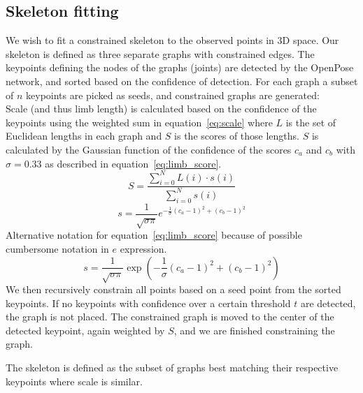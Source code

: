 \subsection{Skeleton fitting}

We wish to fit a constrained skeleton to the observed points in 3D space. Our skeleton is defined as three separate graphs with constrained edges.
The keypoints defining the nodes of the graphs (joints) are detected by the OpenPose network, and sorted based on the confidence of detection. For each graph a subset of $n$ keypoints are picked as seeds, and constrained graphs are generated:\\
Scale (and thus limb length) is calculated based on the confidence of the keypoints using the weighted sum in equation~\ref{eq:scale} where $L$ is the set of Euclidean lengths in each graph and $S$ is the scores of those lengths. $S$ is calculated by the Gaussian function of the confidence of the scores $c_a$ and $c_b$ with $\sigma = 0.33$ as described in equation~\ref{eq:limb_score}.
\begin{equation}
  S = \frac{\sum_{i=0}^{N}L(i) \cdot s(i)}{\sum_{i=0}^{N}s(i)}
  \label{eq:scale}
\end{equation}
\begin{equation}
  s = \frac{1}{\sqrt{\sigma\pi}}e^{-\frac{1}{\sigma}(c_a-1)^2 + (c_b -1)^2}
  \label{eq:limb_score}
\end{equation}
    {\color{red} Alternative notation for equation~\ref{eq:limb_score} because of possible cumbersome notation in $e$ expression.
\[
s = \frac{1}{\sqrt{\sigma\pi}}{\exp}\left(-\frac{1}{\sigma}(c_a-1)^2 + (c_b -1)^2\right)
\]}
We then recursively constrain all points based on a seed point from the sorted keypoints. If no keypoints with confidence over a certain threshold $t$ are detected, the graph is not placed.
The constrained graph is moved to the center of the detected keypoint, again weighted by $S$, and we are finished constraining the graph.

The skeleton is defined as the subset of graphs best matching their respective keypoints where scale is similar.
